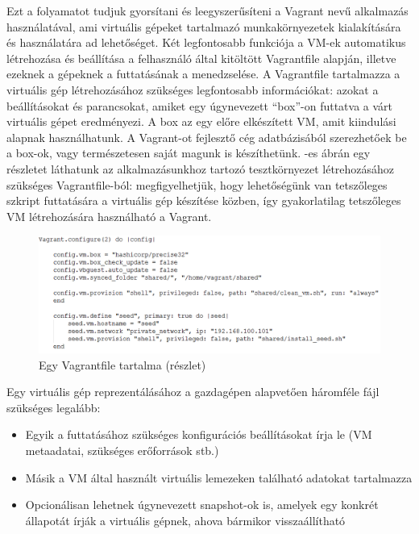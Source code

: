 Ezt a folyamatot tudjuk gyorsítani és leegyszerűsíteni a Vagrant nevű alkalmazás használatával, ami virtuális gépeket tartalmazó munkakörnyezetek kialakítására és használatára ad lehetőséget. Két legfontosabb funkciója a VM-ek automatikus létrehozása és beállítása a felhasználó által kitöltött Vagrantfile alapján, illetve ezeknek a gépeknek a futtatásának a menedzselése. A Vagrantfile tartalmazza a virtuális gép létrehozásához szükséges legfontosabb információkat: azokat a beállításokat és parancsokat, amiket egy úgynevezett ``box''-on futtatva a várt virtuális gépet eredményezi. A box az egy előre elkészített VM, amit kiindulási alapnak használhatunk. A Vagrant-ot fejlesztő cég adatbázisából\cite{atlas} szerezhetőek be a box-ok, vagy természetesen saját magunk is készíthetünk. -es ábrán egy részletet láthatunk az alkalmazásunkhoz tartozó tesztkörnyezet létrehozásához szükséges Vagrantfile-ból: megfigyelhetjük, hogy lehetőségünk van tetszőleges szkript futtatására a virtuális gép készítése közben, így gyakorlatilag tetszőleges VM létrehozására használható a Vagrant.

\begin{figure}[ht]
	\centering
	\includegraphics[width=140mm, keepaspectratio]{figures/vagrantfile.png}
	\caption{Egy Vagrantfile tartalma (részlet)}
	\label{fig:vagrantfile}
\end{figure}

Egy virtuális gép reprezentálásához a gazdagépen alapvetően háromféle fájl szükséges legalább:

\begin{itemize}
	\item Egyik a futtatásához szükséges konfigurációs beállításokat írja le (VM metaadatai, szükséges erőforrások stb.)
	\item Másik a VM által használt virtuális lemezeken található adatokat tartalmazza
	\item Opcionálisan lehetnek úgynevezett snapshot-ok is, amelyek egy konkrét állapotát írják a virtuális gépnek, ahova bármikor visszaállítható
\end{itemize}

